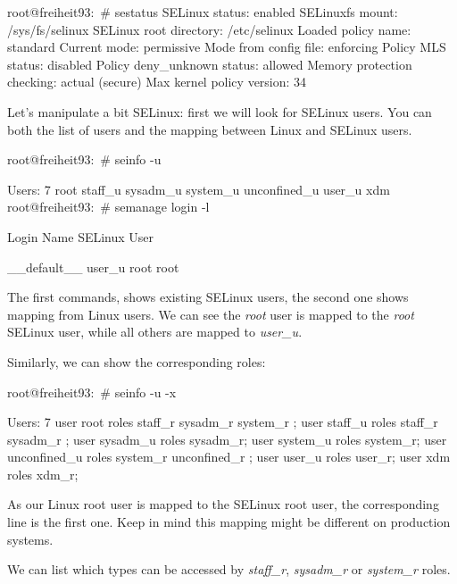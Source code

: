 \begin{bashinput}
root@freiheit93:~# sestatus
SELinux status:                 enabled
SELinuxfs mount:                /sys/fs/selinux
SELinux root directory:         /etc/selinux
Loaded policy name:             standard
Current mode:                   permissive
Mode from config file:          enforcing
Policy MLS status:              disabled
Policy deny_unknown status:     allowed
Memory protection checking:     actual (secure)
Max kernel policy version:      34
\end{bashinput}

Let's manipulate a bit SELinux: first we will look for SELinux users.
You can both the list of users and the mapping between Linux and SELinux users.

\begin{bashinput}
root@freiheit93:~# seinfo -u

Users: 7
   root
   staff_u
   sysadm_u
   system_u
   unconfined_u
   user_u
   xdm
root@freiheit93:~# semanage login -l

Login Name                SELinux User

__default__               user_u
root                      root
\end{bashinput}

The first commands, shows existing SELinux users, the second one shows mapping
from Linux users.
We can see the \emph{root} user is mapped to the \emph{root} SELinux user, while
all others are mapped to \emph{user\_u}.

Similarly, we can show the corresponding roles:

\begin{bashinput}
root@freiheit93:~# seinfo -u -x

Users: 7
   user root roles { staff_r sysadm_r system_r };
   user staff_u roles { staff_r sysadm_r };
   user sysadm_u roles sysadm_r;
   user system_u roles system_r;
   user unconfined_u roles { system_r unconfined_r };
   user user_u roles user_r;
   user xdm roles xdm_r;
\end{bashinput}

As our Linux root user is mapped to the SELinux root user, the corresponding
line is the first one. Keep in mind this mapping might be different on
production systems.

We can list which types can be accessed by \emph{staff\_r}, \emph{sysadm\_r} or
\emph{system\_r} roles.

